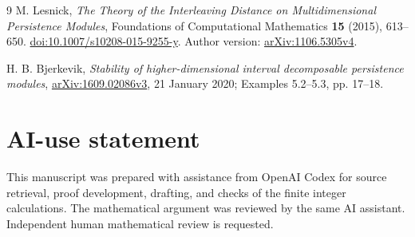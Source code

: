 \documentclass[11pt]{article}
\begin{document}
\begin{thebibliography}{9}
M. Lesnick, \emph{The Theory of the Interleaving Distance on Multidimensional
Persistence Modules}, Foundations of Computational Mathematics
\textbf{15} (2015), 613--650.
\href{https://doi.org/10.1007/s10208-015-9255-y}{doi:10.1007/s10208-015-9255-y}.
Author version: \href{https://arxiv.org/abs/1106.5305v4}{arXiv:1106.5305v4}.

H. B. Bjerkevik, \emph{Stability of higher-dimensional interval decomposable
persistence modules}, \href{https://arxiv.org/abs/1609.02086v3}{arXiv:1609.02086v3},
21 January 2020; Examples 5.2--5.3, pp. 17--18.
\end{thebibliography}

\section*{AI-use statement}
This manuscript was prepared with assistance from OpenAI Codex for source
retrieval, proof development, drafting, and checks of the finite integer
calculations. The mathematical argument was reviewed by the same AI assistant.
Independent human mathematical review is requested.
\end{document}
